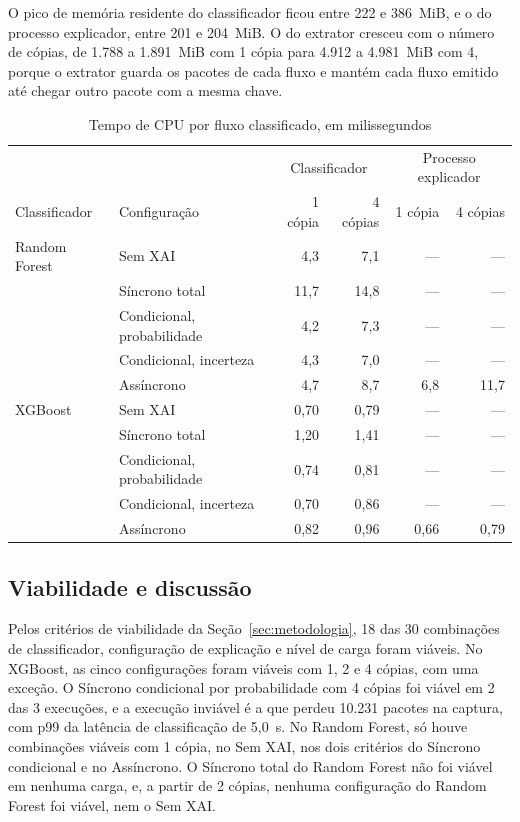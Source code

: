 \documentclass[
  article,
  12pt,
  oneside,
  a4paper,
  english,
  brazil
]{abntex2}
\begin{document}
O pico de memória residente do classificador ficou entre 222 e 386~MiB, e o do processo explicador,
entre 201 e 204~MiB. O do extrator cresceu com o número de cópias, de 1.788 a 1.891~MiB com 1 cópia
para 4.912 a 4.981~MiB com 4, porque o extrator guarda os pacotes de cada fluxo e mantém cada fluxo
emitido até chegar outro pacote com a mesma chave.

\begin{table}[htbp]
  \centering
  \caption{Tempo de CPU por fluxo classificado, em milissegundos}
  \label{tab:cpu}
  \begin{tabular}{llrrrr}
    \toprule
    & & \multicolumn{2}{c}{Classificador} & \multicolumn{2}{c}{Processo explicador} \\
    Classificador & Configuração & 1 cópia & 4 cópias & 1 cópia & 4 cópias \\
    \midrule
    Random Forest & Sem XAI & 4,3 & 7,1 & --- & --- \\
    & Síncrono total & 11,7 & 14,8 & --- & --- \\
    & Condicional, probabilidade & 4,2 & 7,3 & --- & --- \\
    & Condicional, incerteza & 4,3 & 7,0 & --- & --- \\
    & Assíncrono & 4,7 & 8,7 & 6,8 & 11,7 \\
    \midrule
    XGBoost & Sem XAI & 0,70 & 0,79 & --- & --- \\
    & Síncrono total & 1,20 & 1,41 & --- & --- \\
    & Condicional, probabilidade & 0,74 & 0,81 & --- & --- \\
    & Condicional, incerteza & 0,70 & 0,86 & --- & --- \\
    & Assíncrono & 0,82 & 0,96 & 0,66 & 0,79 \\
    \bottomrule
  \end{tabular}
\end{table}

\subsection{Viabilidade e discussão}
\label{sec:viabilidade}

Pelos critérios de viabilidade da Seção~\ref{sec:metodologia}, 18 das 30 combinações de
classificador, configuração de explicação e nível de carga foram viáveis. No XGBoost, as cinco
configurações foram viáveis com 1, 2 e 4 cópias, com uma exceção. O Síncrono condicional por probabilidade com 4 cópias
foi viável em 2 das 3 execuções, e a execução inviável é a que perdeu 10.231 pacotes na captura, com
p99 da latência de classificação de 5,0~s. No Random Forest, só houve combinações viáveis com 1
cópia, no Sem XAI, nos dois critérios do Síncrono condicional e no Assíncrono. O Síncrono total do
Random Forest não foi viável em nenhuma carga, e, a partir de 2 cópias, nenhuma configuração do Random
Forest foi viável, nem o Sem XAI.
\end{document}
